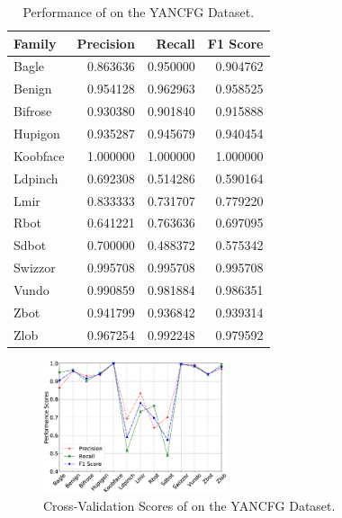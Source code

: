 \begin{table}
\caption{Performance of \sysname on the YANCFG Dataset.}
\begin{center}
\begin{tabular}{l|rrr}
\hline
   Family &  Precision &    Recall &  F1 Score \\
\hline
\hline
    Bagle &   0.863636 &  0.950000 &  0.904762 \\
   Benign &   0.954128 &  0.962963 &  0.958525 \\
  Bifrose &   0.930380 &  0.901840 &  0.915888 \\
  Hupigon &   0.935287 &  0.945679 &  0.940454 \\
 Koobface &   1.000000 &  1.000000 &  1.000000 \\
  Ldpinch &   0.692308 &  0.514286 &  0.590164 \\
     Lmir &   0.833333 &  0.731707 &  0.779220 \\
     Rbot &   0.641221 &  0.763636 &  0.697095 \\
    Sdbot &   0.700000 &  0.488372 &  0.575342 \\
  Swizzor &   0.995708 &  0.995708 &  0.995708 \\
    Vundo &   0.990859 &  0.981884 &  0.986351 \\
     Zbot &   0.941799 &  0.936842 &  0.939314 \\
     Zlob &   0.967254 &  0.992248 &  0.979592 \\
\hline
\end{tabular}
\end{center}
\label{tab:YANCFGScores}
\end{table}

\begin{figure}
\centerline{\includegraphics[width=0.48\textwidth]{Magic/figures/YanAcfgScores.eps}}
\caption{Cross-Validation Scores of \sysname on the YANCFG Dataset.}
\label{fig:YANCFGScores}
\end{figure}

